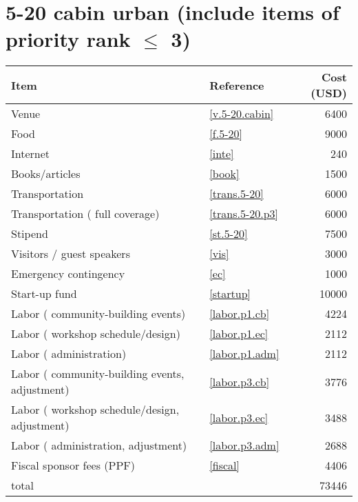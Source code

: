 \section*{5-20 cabin urban (include items of priority rank $\leq$ 3)}
\begin{center}
\begin{tabular}{llr}
Item & Reference & Cost (USD) \\ \hline
Venue & \ref{v.5-20.cabin} & 6400 \\
Food & \ref{f.5-20} & 9000 \\
Internet & \ref{inte} & 240 \\
Books/articles & \ref{book} & 1500 \\
Transportation & \ref{trans.5-20} & 6000 \\
Transportation ( full coverage) & \ref{trans.5-20.p3} & 6000 \\
Stipend & \ref{st.5-20} & 7500 \\
Visitors / guest speakers & \ref{vis} & 3000 \\
Emergency contingency & \ref{ec} & 1000 \\
Start-up fund & \ref{startup} & 10000 \\
Labor ( community-building events) & \ref{labor.p1.cb} & 4224 \\
Labor ( workshop schedule/design) & \ref{labor.p1.ec} & 2112 \\
Labor ( administration) & \ref{labor.p1.adm} & 2112 \\
Labor ( community-building events, adjustment) & \ref{labor.p3.cb} & 3776 \\
Labor ( workshop schedule/design, adjustment) & \ref{labor.p3.ec} & 3488 \\
Labor ( administration, adjustment) & \ref{labor.p3.adm} & 2688 \\
Fiscal sponsor fees (PPF) & \ref{fiscal} & 4406 \\ \hline
total &  & 73446
\end{tabular}
\end{center}
\newpage

